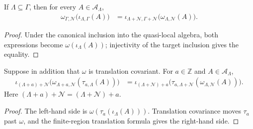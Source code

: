 \begin{lemma}
    \label{thm:qca_finite_region_restriction_enlargement}
    \leanok
    If $\Lambda\subseteq\Gamma$, then for every
    $A\in\mathcal A_\Lambda$,
    \begin{align}
        \omega_{\Gamma,\mathcal N}
        \bigl(\iota_{\Lambda,\Gamma}(A)\bigr)
         & =\iota_{\Lambda+\mathcal N,\Gamma+\mathcal N}
        \bigl(\omega_{\Lambda,\mathcal N}(A)\bigr).
    \end{align}
\end{lemma}

\begin{proof}\leanok
    Under the canonical inclusion into the quasi-local algebra,
    both expressions become $\omega(\iota_\Lambda(A))$; injectivity of the
    target inclusion gives the equality.
\end{proof}

\begin{lemma}
    \label{thm:qca_finite_region_restriction_translation}
    \leanok
    Suppose in addition that $\omega$ is translation covariant.  For
    $a\in\mathbb Z$ and $A\in\mathcal A_\Lambda$,
    \begin{align}
        \iota_{(\Lambda+a)+\mathcal N}
        \bigl(\omega_{\Lambda+a,\mathcal N}
            (\tau_{a,\Lambda}(A))\bigr)
         & =\iota_{(\Lambda+\mathcal N)+a}
        \bigl(\tau_{a,\Lambda+\mathcal N}
            (\omega_{\Lambda,\mathcal N}(A))\bigr).
    \end{align}
    Here $(\Lambda+a)+\mathcal N=(\Lambda+\mathcal N)+a$.
\end{lemma}

\begin{proof}\leanok
    The left-hand side is
    $\omega(\tau_a(\iota_\Lambda(A)))$.  Translation covariance moves
    $\tau_a$ past $\omega$, and the finite-region translation formula gives
    the right-hand side.
\end{proof}

